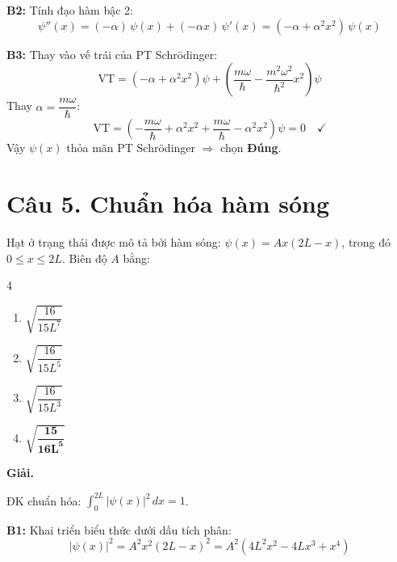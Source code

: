 \documentclass[11pt,a4paper]{article}
\begin{document}
\textbf{B2:} Tính đạo hàm bậc 2:
\begin{equation*}
    \psi''(x) = (-\alpha) \, \psi(x) + (-\alpha x) \, \psi'(x) = (-\alpha + \alpha^2 x^2) \, \psi(x)
\end{equation*}

\textbf{B3:} Thay vào vế trái của PT Schrödinger:
\begin{equation*}
    \text{VT} = \left(-\alpha + \alpha^2 x^2\right)\psi + \left(\frac{m\omega}{\hbar} - \frac{m^2\omega^2}{\hbar^2}x^2\right)\psi
\end{equation*}
Thay $\alpha = \dfrac{m\omega}{\hbar}$:
\begin{equation*}
    \text{VT} = \left(-\frac{m\omega}{\hbar} + \alpha^2 x^2 + \frac{m\omega}{\hbar} - \alpha^2 x^2\right)\psi = 0 \quad \checkmark
\end{equation*}
Vậy $\psi(x)$ thỏa mãn PT Schrödinger $\Longrightarrow$ chọn \textbf{Đúng}.

\vspace{0.5cm}

\section*{Câu 5. Chuẩn hóa hàm sóng}

Hạt ở trạng thái được mô tả bởi hàm sóng: $\psi(x) = Ax(2L - x)$, trong đó $0 \le x \le 2L$. Biên độ $A$ bằng:

\begin{multicols}{4}
\begin{enumerate}[label=\Alph*., itemsep=1pt, topsep=1pt, parsep=0pt, leftmargin=1.8em]
    \item $\sqrt{\dfrac{16}{15L^7}}$
    \item $\sqrt{\dfrac{16}{15L^5}}$
    \item $\sqrt{\dfrac{16}{15L^3}}$
    \item $\boldsymbol{\sqrt{\dfrac{15}{16L^5}}}$
\end{enumerate}
\end{multicols}

\textbf{Giải.}

ĐK chuẩn hóa: $\displaystyle\int_0^{2L} |\psi(x)|^2 \, dx = 1$.

\textbf{B1:} Khai triển biểu thức dưới dấu tích phân:
\begin{equation*}
    |\psi(x)|^2 = A^2 x^2 (2L - x)^2 = A^2 (4L^2 x^2 - 4Lx^3 + x^4)
\end{equation*}
\end{document}

